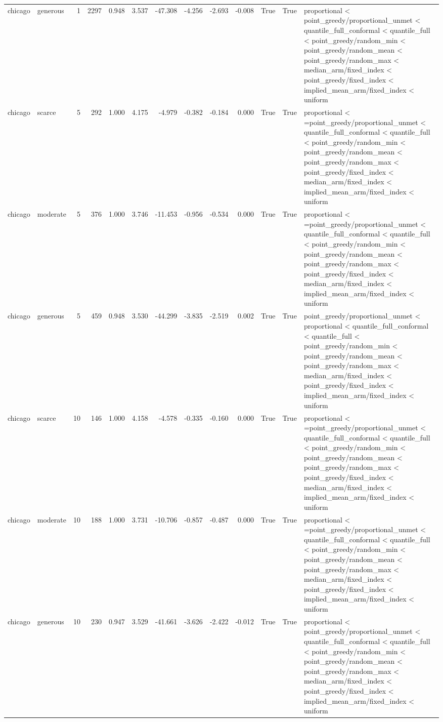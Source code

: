 \begin{tabular}{llrrrrrrrrrrl}
chicago & generous & 1 & 2297 & 0.948 & 3.537 & -47.308 & -4.256 & -2.693 & -0.008 & True & True & proportional < point\_greedy/proportional\_unmet < quantile\_full\_conformal < quantile\_full < point\_greedy/random\_min < point\_greedy/random\_mean < point\_greedy/random\_max < median\_arm/fixed\_index < point\_greedy/fixed\_index < implied\_mean\_arm/fixed\_index < uniform \\
chicago & scarce & 5 & 292 & 1.000 & 4.175 & -4.979 & -0.382 & -0.184 & 0.000 & True & True & proportional < =point\_greedy/proportional\_unmet < quantile\_full\_conformal < quantile\_full < point\_greedy/random\_min < point\_greedy/random\_mean < point\_greedy/random\_max < point\_greedy/fixed\_index < median\_arm/fixed\_index < implied\_mean\_arm/fixed\_index < uniform \\
chicago & moderate & 5 & 376 & 1.000 & 3.746 & -11.453 & -0.956 & -0.534 & 0.000 & True & True & proportional < =point\_greedy/proportional\_unmet < quantile\_full\_conformal < quantile\_full < point\_greedy/random\_min < point\_greedy/random\_mean < point\_greedy/random\_max < point\_greedy/fixed\_index < median\_arm/fixed\_index < implied\_mean\_arm/fixed\_index < uniform \\
chicago & generous & 5 & 459 & 0.948 & 3.530 & -44.299 & -3.835 & -2.519 & 0.002 & True & True & point\_greedy/proportional\_unmet < proportional < quantile\_full\_conformal < quantile\_full < point\_greedy/random\_min < point\_greedy/random\_mean < point\_greedy/random\_max < median\_arm/fixed\_index < point\_greedy/fixed\_index < implied\_mean\_arm/fixed\_index < uniform \\
chicago & scarce & 10 & 146 & 1.000 & 4.158 & -4.578 & -0.335 & -0.160 & 0.000 & True & True & proportional < =point\_greedy/proportional\_unmet < quantile\_full\_conformal < quantile\_full < point\_greedy/random\_min < point\_greedy/random\_mean < point\_greedy/random\_max < point\_greedy/fixed\_index < median\_arm/fixed\_index < implied\_mean\_arm/fixed\_index < uniform \\
chicago & moderate & 10 & 188 & 1.000 & 3.731 & -10.706 & -0.857 & -0.487 & 0.000 & True & True & proportional < =point\_greedy/proportional\_unmet < quantile\_full\_conformal < quantile\_full < point\_greedy/random\_min < point\_greedy/random\_mean < point\_greedy/random\_max < median\_arm/fixed\_index < point\_greedy/fixed\_index < implied\_mean\_arm/fixed\_index < uniform \\
chicago & generous & 10 & 230 & 0.947 & 3.529 & -41.661 & -3.626 & -2.422 & -0.012 & True & True & proportional < point\_greedy/proportional\_unmet < quantile\_full\_conformal < quantile\_full < point\_greedy/random\_min < point\_greedy/random\_mean < point\_greedy/random\_max < median\_arm/fixed\_index < point\_greedy/fixed\_index < implied\_mean\_arm/fixed\_index < uniform \\

\end{tabular}
